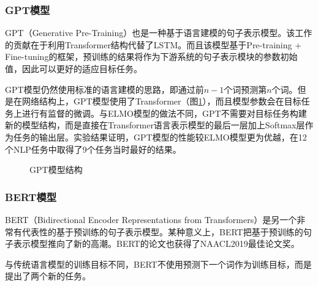 
\subsubsection{GPT模型}

\parinterval  GPT（Generative Pre-Training）也是一种基于语言建模的句子表示模型\cite{radford2018improving}。该工作的贡献在于利用Transformer结构代替了LSTM。而且该模型基于Pre-training + Fine-tuning的框架，预训练的结果将作为下游系统的句子表示模块的参数初始值，因此可以更好的适应目标任务。

\parinterval  GPT模型仍然使用标准的语言建模的思路，即通过前$ n-1 $个词预测第$ n $个词。但是在网络结构上，GPT模型使用了Transformer（图\ref{fig:5-71}），而且模型参数会在目标任务上进行有监督的微调。与ELMO模型的做法不同，GPT不需要对目标任务构建新的模型结构，而是直接在Transformer语言表示模型的最后一层加上Softmax层作为任务的输出层。实验结果证明，GPT模型的性能较ELMO模型更为优越，在12个NLP任务中取得了9个任务当时最好的结果。

\begin{figure}[htp]
\centering

\caption{GPT模型结构}
\label{fig:5-71}
\end{figure}
\vspace{-0.5em}

\subsubsection{BERT模型}

\parinterval  BERT（Bidirectional Encoder Representations from Transformers）是另一个非常有代表性的基于预训练的句子表示模型\cite{DBLP:conf/naacl/DevlinCLT19}。某种意义上，BERT把基于预训练的句子表示模型推向了新的高潮。BERT的论文也获得了NAACL2019最佳论文奖。

\parinterval  与传统语言模型的训练目标不同，BERT不使用预测下一个词作为训练目标，而是提出了两个新的任务。

